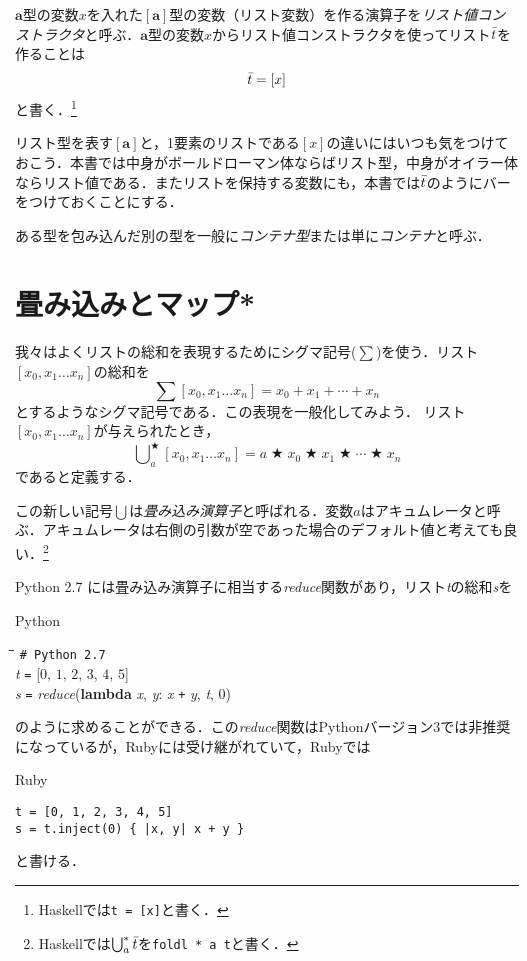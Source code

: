 \documentclass[twocolumn]{jsbook}
\newcommand{\keyword}[1]{{\emph{#1}}}
\newcommand{\code}[1]{\texttt{#1}}
\newenvironment{pythoncode}{\begin{itembox}[r]{Python}}{\end{itembox}}
\newenvironment{rubycode}{\begin{itembox}[r]{Ruby}}{\end{itembox}}
\newenvironment{python}{\begin{tabbing}\hspace*{1em}\=\hspace*{1em}\=\hspace*{1em}\=\hspace*{1em}\=\kill}{\end{tabbing}}
\newcommand{\pthnId}[1]{\textit{#1}}
\newcommand{\pthnKeyword}[1]{\textbf{#1}}
\newcommand{\pthnOp}[1]{\texttt{#1}}
\newcommand{\hsklType}[1]{\textbf{#1}}
\newcommand{\hsklList}[1]{\Bar{#1}}
\newcommand{\hsklListType}[1]{[#1]}
\DeclareMathOperator{\mathAnyBinaryOperator}{\bigstar}
\DeclareMathOperator*{\mathFold}{\bigcup}
\begin{document}
$\hsklType{a}$型の変数$x$を入れた$\hsklListType{\hsklType{a}}$型の変数（リスト変数）を作る演算子を\keyword{リスト値コンストラクタ}と呼ぶ．$\hsklType{a}$型の変数$x$からリスト値コンストラクタを使ってリスト$\hsklList{t}$を作ることは$$\hsklList{t}=[x]$$と書く．\footnote{Haskellでは\code{t = [x]}と書く．}

リスト型を表す$\hsklListType{\hsklType{a}}$と，1要素のリストである$[x]$の違いにはいつも気をつけておこう．本書では中身がボールドローマン体ならばリスト型，中身がオイラー体ならリスト値である．またリストを保持する変数にも，本書では$\hsklList{t}$のようにバーをつけておくことにする．

ある型を包み込んだ別の型を一般に\keyword{コンテナ型}または単に\keyword{コンテナ}と呼ぶ．


\section{畳み込みとマップ*}

我々はよくリストの総和を表現するためにシグマ記号($\sum$)を使う．リスト$[x_0,x_1\dots x_n]$の総和を$$\sum[x_0,x_1\dots x_n]=x_0+x_1+\dotsb+x_n$$とするようなシグマ記号である．この表現を一般化してみよう．
リスト$[x_0,x_1\dots x_n]$が与えられたとき，$$\mathFold^{\mathAnyBinaryOperator}_{a}[x_0,x_1\dots x_n]=a\mathAnyBinaryOperator x_0\mathAnyBinaryOperator x_1\mathAnyBinaryOperator\dotsb\mathAnyBinaryOperator x_n$$であると定義する．

この新しい記号$\mathFold$は\keyword{畳み込み演算子}と呼ばれる．変数$a$はアキュムレータと呼ぶ．アキュムレータは右側の引数が空であった場合のデフォルト値と考えても良い．\footnote{Haskellでは$\mathFold^{*}_{a}\hsklList{t}$を\code{foldl * a t}と書く．}

Python 2.7 には畳み込み演算子に相当する\pthnId{reduce}関数があり，リスト\pthnId{t}の総和\pthnId{s}を
\begin{pythoncode}
\begin{python}
\texttt{\# Python 2.7}\\
\pthnId{t} \pthnOp{=} [$0$, $1$, $2$, $3$, $4$, $5$]\\
\pthnId{s} \pthnOp{=} \pthnId{reduce}(\pthnKeyword{lambda} \pthnId{x}, \pthnId{y}: \pthnId{x} \pthnOp{+} \pthnId{y}, \pthnId{t}, $0$)
\end{python}
\end{pythoncode}
のように求めることができる．この\pthnId{reduce}関数はPythonバージョン3では非推奨になっているが，Rubyには受け継がれていて，Rubyでは
\begin{rubycode}
\begin{Verbatim}
t = [0, 1, 2, 3, 4, 5]
s = t.inject(0) { |x, y| x + y }
\end{Verbatim}
\end{rubycode}
と書ける．
\end{document}
